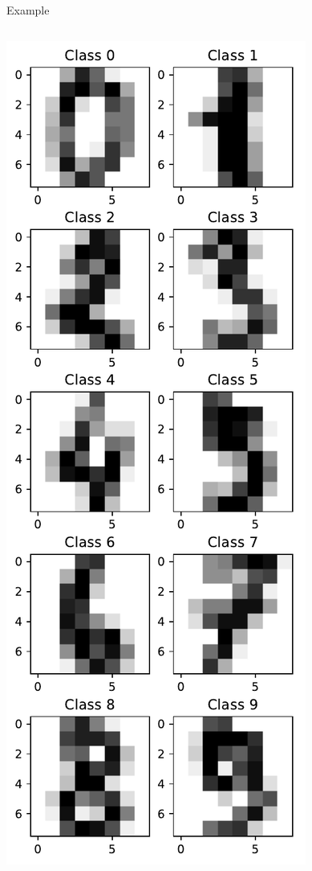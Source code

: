 \documentclass[10pt, aspectratio=169]{beamer} %
\begin{document}
\begin{frame}[fragile,allowframebreaks=0.8]{Example}
\begin{columns}
\includegraphics[width=\textwidth]{digits.pdf}
\end{columns}
\end{frame}
\end{document}
